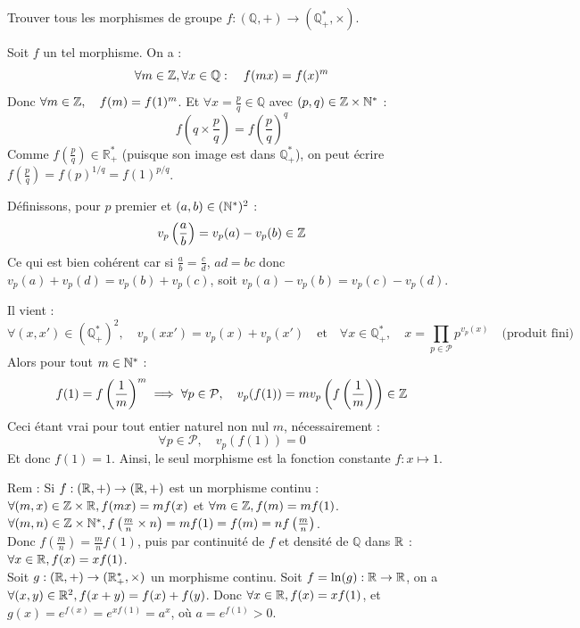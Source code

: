 
\begin{statementbox}
Trouver tous les morphismes de groupe $f : (\mathbb{Q}, +) \to (\mathbb{Q}_+^*, \times)$.
\end{statementbox}

\begin{solution}
Soit $f$ un tel morphisme. On a :
\[ \forall m \in \mathbb Z, \forall x \in \mathbb{Q} : \quad f(mx) = f(x)^m \]
Donc $\forall m \in \mathbb Z, \quad f(m) = f(1)^m$.
Et $\forall x = \frac{p}{q} \in \mathbb{Q}$ avec $(p,q) \in \mathbb Z \times \mathbb N^*$ :
\[ f\left(q \times \frac{p}{q}\right) = f\left(\frac{p}{q}\right)^q \]
Comme $f\left(\frac{p}{q}\right) \in \mathbb{R}_+^*$ (puisque son image est dans $\mathbb{Q}_+^*$), on peut écrire $f\left(\frac{p}{q}\right) = f(p)^{1/q} = f(1)^{p/q}$.

Définissons, pour $p$ premier et $(a,b) \in (\mathbb N^*)^2$ :
\[ v_p\left(\frac{a}{b}\right) = v_p(a) - v_p(b) \in \mathbb Z \]
Ce qui est bien cohérent car si $\frac{a}{b} = \frac{c}{d}$, $ad = bc$ donc $v_p(a) + v_p(d) = v_p(b) + v_p(c)$, soit $v_p(a) - v_p(b) = v_p(c) - v_p(d)$.

Il vient :
\[ \forall (x, x') \in (\mathbb{Q}_+^*)^2, \quad v_p(x x') = v_p(x) + v_p(x') \quad \text{et} \quad \forall x \in \mathbb{Q}_+^*, \quad x = \prod_{p \in \mathcal{P}} p^{v_p(x)} \quad \text{(produit fini)} \]
Alors pour tout $m \in \mathbb N^*$ :
\[ f(1) = f\left(\frac{1}{m}\right)^m \implies \forall p \in \mathcal{P}, \quad v_p(f(1)) = m v_p\left(f\left(\frac{1}{m}\right)\right) \in \mathbb Z \]
Ceci étant vrai pour tout entier naturel non nul $m$, nécessairement :
\[ \forall p \in \mathcal{P}, \quad v_p(f(1)) = 0 \]
Et donc $f(1) = 1$.
Ainsi, le seul morphisme est la fonction constante $\boxed{f : x \mapsto 1}$.

\begin{remarkbox}
Rem : Si $f : (\mathbb R, +) \to (\mathbb R, +)$ est un morphisme continu :
$\forall (m,x) \in \mathbb Z \times \mathbb R, f(mx) = m f(x)$ et $\forall m \in \mathbb Z, f(m) = m f(1)$. \\
$\forall (m,n) \in \mathbb Z \times \mathbb N^*, f\left(\frac{m}{n} \times n\right) = m f(1) = f(m) = n f\left(\frac{m}{n}\right)$. \\
Donc $f\left(\frac{m}{n}\right) = \frac{m}{n} f(1)$, puis par continuité de $f$ et densité de $\mathbb{Q}$ dans $\mathbb R$ : $\forall x \in \mathbb R, f(x) = x f(1)$. \\
Soit $g : (\mathbb R, +) \to (\mathbb R_+^*, \times)$ un morphisme continu. Soit $f = \ln(g) : \mathbb R \to \mathbb R$, on a $\forall (x,y) \in \mathbb R^2, f(x+y) = f(x) + f(y)$.
Donc $\forall x \in \mathbb R, f(x) = x f(1)$, et $g(x) = e^{f(x)} = e^{x f(1)} = a^x$, où $a = e^{f(1)} > 0$.
\end{remarkbox}
\end{solution}

